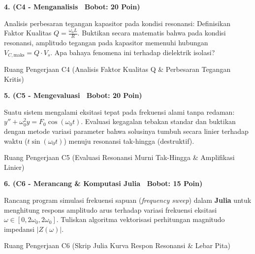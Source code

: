 \documentclass[10pt,a4paper]{article}
\begin{document}
\noindent\textbf{4. (C4 - Menganalisis \textbar\ Bobot: 20 Poin)}\par\vspace{0.5mm}
{\footnotesize Analisis perbesaran tegangan kapasitor pada kondisi resonansi: Definisikan Faktor Kualitas $Q = \frac{\omega_0 L}{R}$. Buktikan secara matematis bahwa pada kondisi resonansi, amplitudo tegangan pada kapasitor memenuhi hubungan $V_{C,\text{maks}} = Q \cdot V_s$. Apa bahaya fenomena ini terhadap dielektrik isolasi?}
\begin{answerbox}{Ruang Pengerjaan C4 (Analisis Faktor Kualitas Q \& Perbesaran Tegangan Kritis)}
  \vspace{3.8cm}
\end{answerbox}

\vspace{1.5mm}

\noindent\textbf{5. (C5 - Mengevaluasi \textbar\ Bobot: 20 Poin)}\par\vspace{0.5mm}
{\footnotesize Suatu sistem mengalami eksitasi tepat pada frekuensi alami tanpa redaman: $y'' + \omega_0^2 y = F_0 \cos(\omega_0 t)$. Evaluasi kegagalan tebakan standar dan buktikan dengan metode variasi parameter bahwa solusinya tumbuh secara linier terhadap waktu ($t \sin(\omega_0 t)$) menuju resonansi tak-hingga (destruktif).}
\begin{answerbox}{Ruang Pengerjaan C5 (Evaluasi Resonansi Murni Tak-Hingga \& Amplifikasi Linier)}
  \vspace{3.8cm}
\end{answerbox}

\vspace{1.5mm}

\noindent\textbf{6. (C6 - Merancang \& Komputasi Julia \textbar\ Bobot: 15 Poin)}\par\vspace{0.5mm}
{\footnotesize Rancang program simulasi frekuensi sapuan (\textit{frequency sweep}) dalam \textbf{Julia} untuk menghitung respons amplitudo arus terhadap variasi frekuensi eksitasi $\omega \in [0{,}2\omega_0, 2\omega_0]$. Tuliskan algoritma vektorisasi perhitungan magnitudo impedansi $|Z(\omega)|$.}
\begin{answerbox}{Ruang Pengerjaan C6 (Skrip Julia Kurva Respon Resonansi \& Lebar Pita)}
  \vspace{3.8cm}
\end{answerbox}

\vspace{1.5mm}
\end{document}
